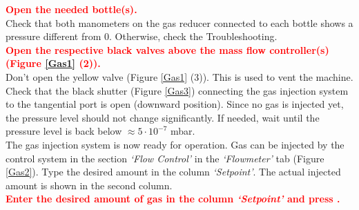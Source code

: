 \documentclass[fleqn,a4paper,20pt]{article}
\begin{document}
\begin{minipage}{.68\textwidth}

		
\textcolor{red}{\textbf{Open the needed bottle(s).}}\\

Check that both manometers on the gas reducer connected to each bottle shows a pressure different from 0. Otherwise, check the Troubleshooting.\\

\textcolor{red}{\textbf{Open the respective black valves above the mass flow controller(s) (Figure \ref{Gas1} (2)).}}\\


Don’t open the yellow valve (Figure \ref{Gas1} (3)). This is used to vent the machine. Check that the black shutter (Figure \ref{Gas3}) connecting the gas injection system to the tangential port is open (downward position). Since no gas is injected yet, the pressure level should not change significantly. If needed, wait until the pressure level is back below  $\approx 5\cdot 10^{-7}$ mbar.\\

The gas injection system is now ready for operation. Gas can be injected by the control system in the section \textit{`Flow Control'} in the \textit{`Flowmeter'} tab (Figure \ref{Gas2}). Type the desired amount in the column \textit{`Setpoint'}. The actual injected amount is shown in the second column.\\

\textcolor{red}{\textbf{Enter the desired amount of gas in the column \textit{`Setpoint'} and press \keys{\enter}.}}\\
\end{minipage}
\begin{minipage}{.02\textwidth}
$\ $\\
\end{minipage}
\end{document}

